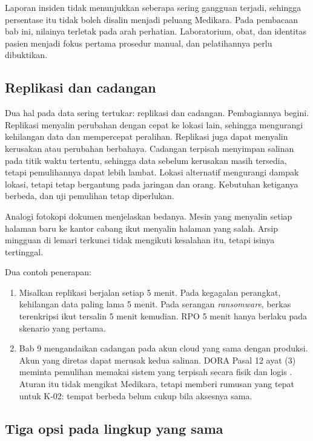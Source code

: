 Laporan insiden tidak menunjukkan seberapa sering gangguan terjadi, sehingga persentase itu tidak
boleh disalin menjadi peluang Medikara. Pada pembacaan bab ini, nilainya terletak pada arah
perhatian. Laboratorium, obat, dan identitas pasien menjadi fokus pertama prosedur manual, dan
pelatihannya perlu dibuktikan.

\subsection*{Replikasi dan cadangan}

Dua hal pada data sering tertukar: replikasi dan cadangan. Pembagiannya begini. Replikasi menyalin
perubahan dengan cepat ke lokasi lain, sehingga mengurangi kehilangan data dan mempercepat
peralihan. Replikasi juga dapat menyalin kerusakan atau perubahan berbahaya. Cadangan terpisah
menyimpan salinan pada titik waktu tertentu, sehingga data sebelum kerusakan masih tersedia, tetapi
pemulihannya dapat lebih lambat. Lokasi alternatif mengurangi dampak lokasi, tetapi tetap bergantung
pada jaringan dan orang. Kebutuhan ketiganya berbeda, dan uji pemulihan tetap diperlukan.

Analogi fotokopi dokumen menjelaskan bedanya. Mesin yang menyalin setiap halaman baru ke kantor
cabang ikut menyalin halaman yang salah. Arsip mingguan di lemari terkunci tidak mengikuti kesalahan
itu, tetapi isinya tertinggal.

Dua contoh penerapan:
\begin{enumerate}
  \item Misalkan replikasi berjalan setiap 5 menit. Pada kegagalan perangkat, kehilangan data
  paling lama 5 menit. Pada serangan \textit{ransomware}, berkas terenkripsi ikut tersalin 5 menit
  kemudian. RPO 5 menit hanya berlaku pada skenario yang pertama.
  \item Bab 9 mengandaikan cadangan pada akun cloud yang sama dengan produksi. Akun yang diretas
  dapat merusak kedua salinan. DORA Pasal 12 ayat (3) meminta pemulihan memakai sistem yang terpisah
  secara fisik dan logis \cite{c10-dora}. Aturan itu tidak mengikat Medikara, tetapi memberi rumusan
  yang tepat untuk K-02: tempat berbeda belum cukup bila aksesnya sama.
\end{enumerate}

\subsection*{Tiga opsi pada lingkup yang sama}

